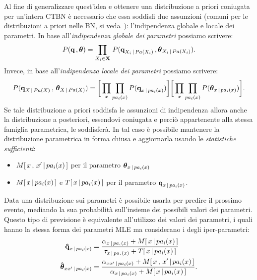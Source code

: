 Al fine di generalizzare quest'idea e ottenere una distribuzione a priori coniugata per un'intera \acs{CTBN} è necessario che essa soddisfi due assunzioni (comuni per le distribuzioni a priori nelle \acl{BN}, si veda~\citet{Heckerman1996}): l'indipendenza globale e locale dei parametri. In base all'\emph{indipendenza globale dei parametri} possiamo scrivere:
\begin{equation}\label{eq:ctbn-bayesian-params-globalind}
P(\boldsymbol{\textbf{\text{q}}}\,,\boldsymbol{\textbf{\text{$\theta$}}})=\prod_{\mathnormal{X}_i\in\mathbf{X}}\,P(\boldsymbol{\textbf{\text{q}}}_{\mathnormal{X}_i\,\arrowvert\,Pa(\mathnormal{X}_i)}\,,\boldsymbol{\textbf{\text{$\theta$}}}_{\mathnormal{X}_i\,\arrowvert\,Pa(\mathnormal{X}_i)})\text{.}
\end{equation}
Invece, in base all'\emph{indipendenza locale dei parametri} possiamo scrivere:
\footnotesize
\begin{equation}\label{eq:ctbn-bayesian-params-localind}
P(\boldsymbol{\textbf{\text{q}}}_{\mathnormal{X}\,\arrowvert\,Pa(\mathnormal{X})}\,,\,\boldsymbol{\textbf{\text{$\theta$}}}_{\mathnormal{X}\,\arrowvert\,Pa(\mathnormal{X})}) = \bigg[ \prod_{\mathnormal{x}}\prod_{pa_i(\mathnormal{x})} P(\boldsymbol{\textbf{\text{q}}}_{\mathnormal{x}\,\arrowvert\,pa_i(\mathnormal{x})}) \bigg] \bigg[ \prod_{\mathnormal{x}}\prod_{pa_i(\mathnormal{x})} P(\boldsymbol{\textbf{\text{$\theta$}}}_{\mathnormal{x}\,\arrowvert\,pa_i(\mathnormal{x})}) \bigg]\text{\normalsize .}
\end{equation}\normalsize
Se tale distribuzione a priori soddisfa le assunzioni di indipendenza allora anche la distribuzione a posteriori, essendovi coniugata e perciò appartenente alla stessa famiglia parametrica, le soddisferà. In tal caso è possibile mantenere la distribuzione parametrica in forma chiusa e aggiornarla usando le \emph{statistiche sufficienti}:
\begin{itemize}
\item $\mstat[x]{\setel{x}^{\prime}\,\arrowvert\,pa_i(\setel{x})}$ per il parametro $\boldsymbol{\textbf{\text{$\theta$}}}_{\mathnormal{x}\,\arrowvert\,pa_i(\mathnormal{x})}$
\item $\mstat{x\,\arrowvert\,pa_i(\setel{x})}$ e $T[\,\mathnormal{x\,\arrowvert\,pa_i(\mathnormal{x})}\,]$ per il parametro $\boldsymbol{\textbf{\text{q}}}_{\mathnormal{x}\,\arrowvert\,pa_i(\mathnormal{x})}$.
\end{itemize}
Data una distribuzione sui parametri è possibile usarla per predire il prossimo evento, mediando la sua probabilità sull'insieme dei possibili valori dei parametri. Questo tipo di previsione è equivalente all'utilizzo dei valori \emph{} dei parametri, i quali hanno la stessa forma dei parametri \acl{MLE} ma considerano i \emph{} degli iper-parametri:
\begin{equation}
\label{eq:ctbn-imaginary-params}
\begin{split}
\paramhat{q}_{x\,\arrowvert\,pa_i(\setel{x})}&=\frac{\alpha_{\setel{x}\,\arrowvert\,pa_i(\setel{x})} + \mstat{x\,\arrowvert\,pa_i(\setel{x})}}{\tau_{\setel{x}\,\arrowvert\,pa_i(\setel{x})} + \tstat{x\,\arrowvert\,pa_i(\setel{x})}} \\
\greekhat{\theta}_{xx^\prime\,\arrowvert\,pa_i(\setel{x})}&=\frac{\alpha_{\setel{x}\setel{x}^{\prime}\,\arrowvert\,pa_i(\setel{x})}+\mstat[x]{x^\prime\,\arrowvert\,pa_i(\setel{x})}}{\alpha_{\setel{x}\,\arrowvert\,pa_i(\setel{x})} + \mstat{x\,\arrowvert\,pa_i(\setel{x})}}\text{.}
\end{split}
\end{equation}
